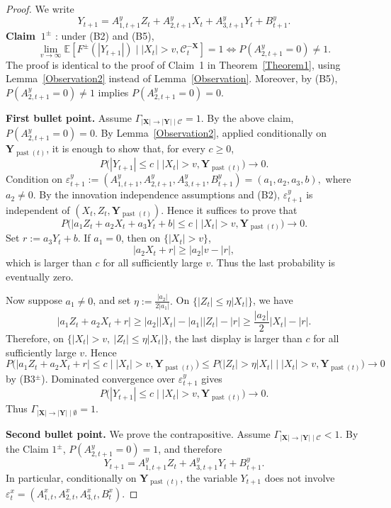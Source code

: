 \documentclass[a4paper,11pt]{article}
\DeclareMathOperator{\past}{past}
\begin{document}
\begin{proof}\label{proof_of_Theorem1_both_tails_lemma}
We write
\[
Y_{t+1}
=
A^y_{1,t+1}Z_t+A^y_{2,t+1}X_t+A^y_{3,t+1}Y_t+B^y_{t+1}.
\]
\textbf{Claim~$1^\pm$} : under (B2) and (B5),
\[
\lim_{v\to\infty}
\mathbb E\!\left[
F^\pm(|Y_{t+1}|)\mid |X_t|>v,\mathcal C_t^{-\mathbf X}
\right]=1
\iff
P(A^y_{2,t+1}=0)\neq 1 .
\]
The proof is identical to the proof of Claim~1 in Theorem~\ref{Theorem1}, using
Lemma~\ref{Observation2} instead of Lemma~\ref{Observation}. Moreover, by (B5),
\(P(A^y_{2,t+1}=0)\neq 1\) implies \(P(A^y_{2,t+1}=0)=0\).


\textbf{First bullet point.}
Assume \(\Gamma_{|\mathbf X|\to|\mathbf Y|\mid\mathcal C}=1\). By the above claim,
\(P(A^y_{2,t+1}=0)=0\). By Lemma~\ref{Observation2}, applied conditionally on
\(\mathbf Y_{\past(t)}\), it is enough to show that, for every \(c\geq0\),
\[
P\bigl(|Y_{t+1}|\leq c\mid |X_t|>v,\mathbf Y_{\past(t)}\bigr)\to0 .
\]
Condition on \(
\varepsilon^y_{t+1}:=
(A^y_{1,t+1},A^y_{2,t+1},A^y_{3,t+1},B^y_{t+1})
=(a_1,a_2,a_3,b),
\)
where \(a_2\neq0\). By the innovation independence assumptions and (B2),
\(\varepsilon^y_{t+1}\) is independent of \((X_t,Z_t,\mathbf Y_{\past(t)})\). Hence it
suffices to prove that
\[
P\bigl(|a_1Z_t+a_2X_t+a_3Y_t+b|\leq c\mid |X_t|>v,\mathbf Y_{\past(t)}\bigr)\to0 .
\]
Set \(r:=a_3Y_t+b\). If \(a_1=0\), then on \(\{|X_t|>v\}\),
\[
|a_2X_t+r|\geq |a_2|v-|r|,
\]
which is larger than \(c\) for all sufficiently large \(v\). Thus the last
probability is eventually zero.

Now suppose \(a_1\neq0\), and set \(
\eta:=\frac{|a_2|}{2|a_1|}.
\) On \(\{|Z_t|\leq \eta |X_t|\}\), we have
\[
|a_1Z_t+a_2X_t+r|
\geq
|a_2||X_t|-|a_1||Z_t|-|r|
\geq
\frac{|a_2|}{2}|X_t|-|r|.
\]
Therefore, on \(\{|X_t|>v,\ |Z_t|\leq \eta |X_t|\}\), the last display is
larger than \(c\) for all sufficiently large \(v\). Hence
\[
P\bigl(|a_1Z_t+a_2X_t+r|\leq c\mid |X_t|>v,\mathbf Y_{\past(t)}\bigr)
\leq
P\bigl(|Z_t|>\eta |X_t|\mid |X_t|>v,\mathbf Y_{\past(t)}\bigr)\to0
\]
by (B3\(^{\pm}\)). Dominated convergence over
\(\varepsilon^y_{t+1}\) gives
\[
P\bigl(|Y_{t+1}|\leq c\mid |X_t|>v,\mathbf Y_{\past(t)}\bigr)\to0 .
\]
Thus \(
\Gamma_{|\mathbf X|\to|\mathbf Y|\mid\emptyset}=1 .
\)

\textbf{Second bullet point.}
We prove the contrapositive. Assume
\(
\Gamma_{|\mathbf X|\to|\mathbf Y|\mid\mathcal C}<1 .
\) 
By the Claim $1^{\pm}$,
\(P(A^y_{2,t+1}=0)=1\), and therefore
\[
Y_{t+1}=A^y_{1,t+1}Z_t+A^y_{3,t+1}Y_t+B^y_{t+1}.
\]
In particular, conditionally on \(\mathbf Y_{\past(t)}\), the variable \(Y_{t+1}\) does
not involve \(
\varepsilon^x_t=(A^x_{1,t},A^x_{2,t},A^x_{3,t},B^x_t).
\)


\end{proof}
\end{document}
